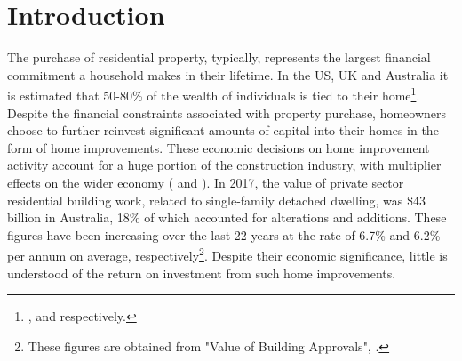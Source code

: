 \documentclass[AEJ,reqno, draftmode]{AEA} %
\begin{document}
\maketitle{}


\section{Introduction}


The purchase of residential property, typically, represents the largest financial commitment a household makes in their lifetime. In the US, UK and Australia it is estimated that 50-80\% of the wealth of individuals is tied to their home\footnote{\citet{fed}, \citet{allocuk} and \citet{hilda} respectively.}. Despite the financial constraints associated with property purchase, homeowners choose to further reinvest significant amounts of capital into their homes in the form of home improvements. These economic decisions on home improvement activity account for a huge portion of the construction industry, with multiplier effects on the wider economy (\cite{miles1992housing} and \cite{meffect}). In 2017, the value of private sector residential building work, related to single-family detached dwelling, was \$43 billion in Australia, 18\% of which accounted for alterations and additions. These figures have been increasing over the last 22 years at the rate of 6.7\% and 6.2\% per annum on average, respectively\footnote{These figures are obtained from "Value of Building Approvals", \citet{abs1}.}.  Despite their economic significance, little is understood of the return on investment from such home improvements.


\end{document}
